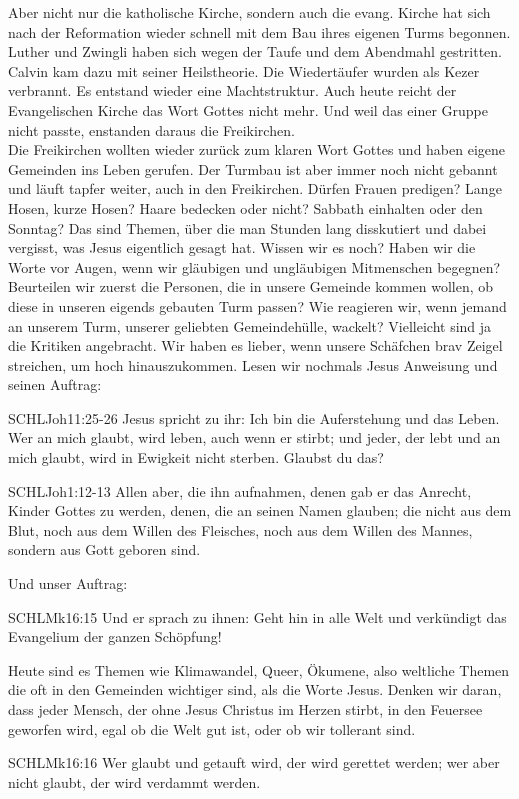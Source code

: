 \documentclass[fontsize=16pt]{mybib}
\begin{document}
\begin{otsblock}
    Aber nicht nur die katholische Kirche, sondern auch die evang. Kirche hat sich nach der Reformation wieder schnell mit dem Bau ihres eigenen Turms begonnen.
    Luther und Zwingli haben sich wegen der Taufe und dem Abendmahl gestritten. Calvin kam dazu mit seiner Heilstheorie. Die Wiedertäufer wurden als Kezer verbrannt. Es entstand wieder eine Machtstruktur. Auch heute reicht der Evangelischen Kirche das Wort Gottes nicht mehr. Und weil das einer Gruppe nicht passte, enstanden daraus die Freikirchen.\\
    Die Freikirchen wollten wieder zurück zum klaren Wort Gottes und haben eigene Gemeinden ins Leben gerufen. Der Turmbau ist aber immer noch nicht gebannt und läuft tapfer weiter, auch in den Freikirchen. Dürfen Frauen predigen? Lange Hosen, kurze Hosen? Haare bedecken oder nicht? Sabbath einhalten oder den Sonntag? Das sind Themen, über die man Stunden lang disskutiert und dabei vergisst, was Jesus eigentlich gesagt hat. Wissen wir es noch? Haben wir die Worte vor Augen, wenn wir gläubigen und ungläubigen Mitmenschen begegnen? Beurteilen wir zuerst die Personen, die in unsere Gemeinde kommen wollen, ob diese in unseren eigends gebauten Turm passen? Wie reagieren wir, wenn jemand an unserem Turm, unserer geliebten Gemeindehülle, wackelt? Vielleicht sind ja die Kritiken angebracht. Wir haben es lieber, wenn unsere Schäfchen brav Zeigel streichen, um hoch hinauszukommen.
    Lesen wir nochmals Jesus Anweisung und seinen Auftrag:
    \begin{bibelbox}{SCHL}{Joh}{11:25-26}
        Jesus spricht zu ihr: Ich bin die Auferstehung und das Leben. Wer an mich glaubt, wird leben, auch wenn er stirbt; und jeder, der lebt und an mich glaubt, wird in Ewigkeit nicht sterben. Glaubst du das?
    \end{bibelbox} 
    \begin{bibelbox}{SCHL}{Joh}{1:12-13}
        Allen aber, die ihn aufnahmen, denen gab er das Anrecht, Kinder Gottes zu werden, denen, die an seinen Namen glauben;
        die nicht aus dem Blut, noch aus dem Willen des Fleisches, noch aus dem Willen des Mannes, sondern aus Gott geboren sind.
    \end{bibelbox}     
    Und unser Auftrag:
    \begin{bibelbox}{SCHL}{Mk}{16:15}
        Und er sprach zu ihnen: Geht hin in alle Welt und verkündigt das Evangelium der ganzen Schöpfung!
    \end{bibelbox} 
    Heute sind es Themen wie Klimawandel, Queer, Ökumene, also weltliche Themen die oft in den Gemeinden wichtiger sind, als die Worte Jesus. Denken wir daran, dass jeder Mensch, der ohne Jesus Christus im Herzen stirbt, in den Feuersee geworfen wird, egal ob die Welt gut ist, oder ob wir tollerant sind. 
    \begin{bibelbox}{SCHL}{Mk}{16:16}
        Wer glaubt und getauft wird, der wird gerettet werden; wer aber nicht glaubt, der wird verdammt werden.
    \end{bibelbox} 
\end{otsblock}
\end{document}
